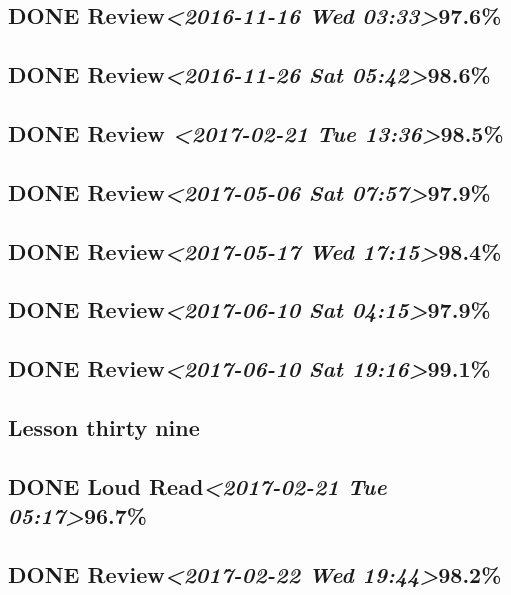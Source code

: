\documentclass[11pt]{ctexart}
\begin{document}
\subsection{{\bfseries\sffamily DONE} Review\textit{<2016-11-16 Wed 03:33>}97.6\%}
\label{sec:org8143aab}
\subsection{{\bfseries\sffamily DONE} Review\textit{<2016-11-26 Sat 05:42>}98.6\%}
\label{sec:org8a56d40}
\subsection{{\bfseries\sffamily DONE} Review \textit{<2017-02-21 Tue 13:36>}98.5\%}
\label{sec:org453423b}
\subsection{{\bfseries\sffamily DONE} Review\textit{<2017-05-06 Sat 07:57>}97.9\%}
\label{sec:org2f25456}
\subsection{{\bfseries\sffamily DONE} Review\textit{<2017-05-17 Wed 17:15>}98.4\%}
\label{sec:orgda60159}
\subsection{{\bfseries\sffamily DONE} Review\textit{<2017-06-10 Sat 04:15>}97.9\%}
\label{sec:org6d55d63}
\subsection{{\bfseries\sffamily DONE} Review\textit{<2017-06-10 Sat 19:16>}99.1\%}
\label{sec:orgca519cb}
\subsection{Lesson thirty nine}
\label{sec:org6c7277b}

\subsection{{\bfseries\sffamily DONE} Loud Read\textit{<2017-02-21 Tue 05:17>}96.7\%}
\label{sec:org915e932}
\subsection{{\bfseries\sffamily DONE} Review\textit{<2017-02-22 Wed 19:44>}98.2\%}
\label{sec:org2f42813}
\end{document}
